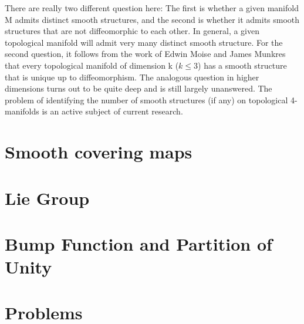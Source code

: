 There are really two different question here: The first is whether a given manifold M admits distinct
smooth structures, and the second is whether it admits smooth structures that are not diffeomorphic to
each other. In general, a given topological manifold will admit very many distinct smooth structure.
For the second question, it  follows from the work of Edwin Moise and James Munkres that every topological
manifold of dimension k ($k\leqslant 3$) has a smooth structure that is unique up to diffeomorphism.
The analogous question in higher dimensions turns out to be quite deep and is still largely unanswered.
The problem of identifying the number of smooth structures (if any) on topological 4-manifolds is an
active subject of current research.
\section{Smooth covering maps}
\section{Lie Group}
\section{Bump Function and Partition of Unity}
\section{Problems}